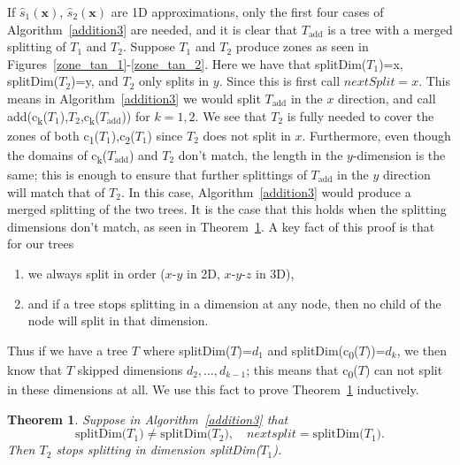\documentclass{article}
\newtheorem{theorem}{Theorem}[section]
\newcommand{\vect}[1]{\mathbf{#1}}
\newcommand{\child}[1]{c\textsubscript{#1}}
\begin{document}
If $\hat{s}_1(\vect{x})$, $\hat{s}_2(\vect{x})$ are 1D approximations, only the first four cases of Algorithm~\ref{addition3} are needed, and it is clear that $T_{\text{add}}$ is a tree with a merged splitting of $T_1$ and $T_2$. Suppose $T_1$ and $T_2$ produce zones as seen in Figures~\ref{zone_tan_1}-\ref{zone_tan_2}. Here we have that splitDim($T_1$)=x, splitDim($T_2$)=y, and $T_2$ only splits in $y$. Since this is first call $nextSplit=x$. This means in Algorithm~\ref{addition3} we would split $T_{\mbox{add}}$ in the $x$ direction, and call add(\child{k}($T_1$),$T_2$,\child{k}($T_{\mbox{add}}$)) for $k=1,2$.  We see that $T_2$ is fully needed to cover the zones of both \child{1}($T_1$),\child{2}($T_1$) since $T_2$ does not split in $x$. Furthermore, even though the domains of \child{k}($T_{\mbox{add}}$) and $T_2$ don't match, the length in the $y$-dimension is the same; this is enough to ensure that further splittings of $T_{\mbox{add}}$ in the $y$ direction will match that of $T_2$. In this case, Algorithm~\ref{addition3} would produce a merged splitting of the two trees. It is the case that this holds when the splitting dimensions don't match, as seen in Theorem~\ref{split_theorem}.  A key fact of this proof is that for our trees
\begin{enumerate}
\item we always split in order ($x$-$y$ in 2D, $x$-$y$-$z$ in 3D),
\item and if a tree stops splitting in a dimension at any node, then no child of the node will split in that dimension.
\end{enumerate} 
Thus if we have a tree $T$ where splitDim($T$)=$d_1$ and splitDim(\child{0}($T$))=$d_k$, we then know that $T$ skipped dimensions $d_2,\dots,d_{k-1}$; this means that \child{0}($T$) can not split in these dimensions at all. We use this fact to prove Theorem~\ref{split_theorem} inductively.


\begin{theorem}
Suppose in Algorithm~\ref{addition3} that 
\begin{equation}
\text{splitDim($T_1$)} \neq \text{splitDim($T_2$)}, \quad nextsplit=\text{splitDim($T_1$)}.
\label{split_assump}
\end{equation}
Then $T_2$ stops splitting in dimension splitDim($T_1$). 
\label{split_theorem}
\end{theorem}
\end{document}

